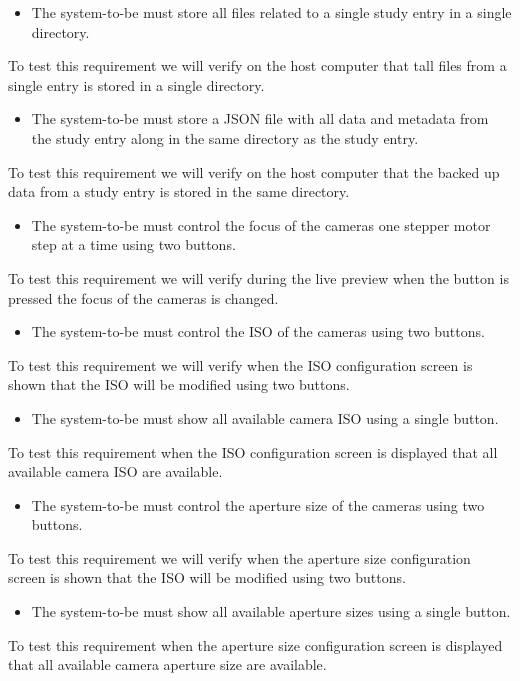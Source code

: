 \begin{itemize}
    \item The system-to-be must store all files related to a single study entry in a single directory.
\end{itemize}
To test this requirement we will verify on the host computer that tall files from a single entry is stored in a single directory.
\begin{itemize}
    \item The system-to-be must store a JSON file with all data and metadata from the study entry along in the same directory as the study entry.
\end{itemize}
To test this requirement we will verify on the host computer that the backed up data from a study entry is stored in the same directory.
\begin{itemize}
    \item The system-to-be must control the focus of the cameras one stepper motor step at a time using two buttons.
\end{itemize}
To test this requirement we will verify during the live preview when the button is pressed the focus of the cameras is changed.
\begin{itemize}
    \item The system-to-be must control the ISO of the cameras using two buttons.
\end{itemize}
To test this requirement we will verify when the ISO configuration screen is shown that the ISO will be modified using two buttons.
\begin{itemize}
    \item The system-to-be must show all available camera ISO using a single button.
\end{itemize}
To test this requirement when the ISO configuration screen is displayed that all available camera ISO are available.
\begin{itemize}
    \item The system-to-be must control the aperture size of the cameras using two buttons.
\end{itemize}
To test this requirement we will verify when the aperture size configuration screen is shown that the ISO will be modified using two buttons.
\begin{itemize}
    \item The system-to-be must show all available aperture sizes using a single button.
\end{itemize}
To test this requirement when the aperture size configuration screen is displayed that all available camera aperture size are available.
